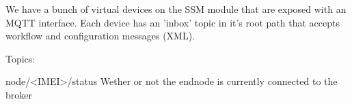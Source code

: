 We have a bunch of virtual devices on the SSM module that are exposed with an
MQTT interface. Each device has an 'inbox' topic in it's root path that accepts
workflow and configuration messages (XML).

Topics:

node/<IMEI>/status
Wether or not the endnode is currently connected to the broker




    
    
    
    
    
    
    
    
    
    
    
    
    
    
    
    
    
    
    
    
    
    
    
    
    
    
    
    
    
    
  
  
  
  
  
  
  
  
  
  
  
  